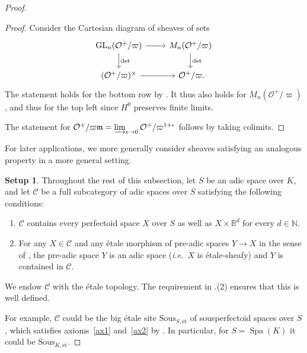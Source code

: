 \documentclass[10pt,a4paper]{article}
\theoremstyle{definition}
\newtheorem{Setup}[thm]{Setup}
\theoremstyle{remark}
\newcommand{\B}{\mathbb{B}}
\newcommand{\N}{\mathbb{N}}
\renewcommand{\O}{\mathcal{O}}
\newcommand{\m}{\mathfrak{m}}
\newcommand{\GL}{\operatorname{GL}}
\newcommand{\Spa}{\operatorname{Spa}}
\newcommand{\et}{{\operatorname{\acute{e}t}}}
\newcommand{\Sous}{\mathrm{Sous}}
\numberwithin{equation}{section}
\begin{document}
\begin{proof}
        \begin{proof}
		Consider the Cartesian diagram of sheaves of sets
		\[\begin{tikzcd}
			\GL_n(\O^+/\varpi) \arrow[d,"\det"] \arrow[r] & M_n(\O^+/\varpi) \arrow[d,"\det"] \\
			(\O^+/\varpi)^\times \arrow[r] & \O^+/\varpi\rlap{.}
		\end{tikzcd}\]
		The statement holds for the bottom row by \cite[Lemma 3.10]{heuer-diamantine-Picard}. It thus also holds for $M_n(\O^+/\varpi)$, and thus for the top left since $H^0$ preserves finite limits.
		
		The statement for $\O^+/\varpi\m=\varinjlim_{\epsilon\to 0} \O^+/\varpi^{1+\epsilon}$ follows by taking colimits.
	\end{proof}
	
	For later applications, we more generally consider sheaves satisfying an analogous property in a more general setting. 
	
	\begin{Setup}\label{setup}
		Throughout the rest of this subsection, let $S$ be an adic space over $K$, and let $\mathcal C$ be a full subcategory of  adic spaces over $S$ satisfying the following conditions:
	\begin{enumerate}
		\item\label{ax1} $\mathcal C$ contains every perfectoid space $X$ over $S$ as well as $X\times \B^d$ for every $d\in \N$.
		\item\label{ax2} For any $X\in \mathcal C$ and any \'etale morphism of pre-adic spaces $Y\to X$ in the sense of \cite[Definition 8.2.16]{KedlayaLiu-rel-p-p-adic-Hodge-I}, the pre-adic space $Y$ is an adic space (\textit{i.e.}~$X$ is \'etale-sheafy) and $Y$ is contained in $\mathcal C$.
	\end{enumerate}
	We endow $\mathcal C$ with the \'etale topology.
	The requirement in .(2)
        ensures that this is well defined.
	\end{Setup}

        For example, $\mathcal C$ could be the big \'etale site $\Sous_{S,\et}$ of sousperfectoid spaces over $S$, which satisfies axioms~\eqref{ax1} and~\eqref{ax2} by \cite[Proposition 6.3.3]{ScholzeBerkeleyLectureNotes}. In particular, for $S=\Spa(K)$ it could be $\Sous_{K,\et}$.


\end{proof}
\end{document}
